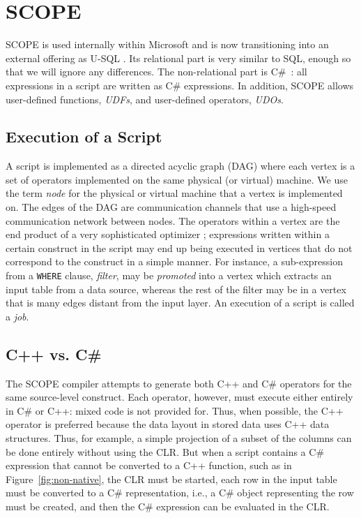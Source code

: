 \section{SCOPE \label{sec:Scope}}

SCOPE \cite{} is used internally within Microsoft and is now transitioning into an external offering as U-SQL \cite{}.
Its relational part is very similar to SQL, enough so that we will ignore any differences.
The non-relational part is C\#~\cite{Hejlsberg:2010:CPL:1951915}: all expressions in a script are written as C\# expressions.
In addition, SCOPE allows user-defined functions, {\em UDFs}, and user-defined operators, {\em UDOs}.

\subsection{Execution of a Script}
A script is implemented as a directed acyclic graph (DAG) where each vertex is a set of operators implemented on the same physical (or virtual) machine. We use the term {\it node} for the physical or virtual machine that a vertex is implemented on.
The edges of the DAG are communication channels that use a high-speed communication network between nodes.
The operators within a vertex are the end product of a very sophisticated optimizer \cite{}; expressions written within a certain construct in the script may end up being executed in vertices that do not correspond to the construct in a simple manner.
For instance, a sub-expression from a {\tt WHERE} clause, {\em filter}, may be {\it promoted} into a vertex which extracts an input table from a data source, whereas the rest of the filter may be in a vertex that is many edges distant from the input layer.
An execution of a script is called a {\em job}.

\subsection{C++ vs. C\#}
The SCOPE compiler attempts to generate both C++ and C\# operators for the same source-level construct.
Each operator, however, must execute either entirely in C\# or C++: mixed code is not provided for.
Thus, when possible, the C++ operator is preferred because the data layout in stored data uses C++ data structures.
Thus, for example, a simple projection of a subset of the columns can be done entirely
without using the CLR.
But when a script contains a C\# expression that cannot be converted to a C++ function, such as in Figure~\ref{fig:non-native}, the CLR must be started, each row in the input table must be converted to a C\# representation, i.e., a C\# object representing the row must be created, and then the C\# expression can be evaluated in the CLR.

